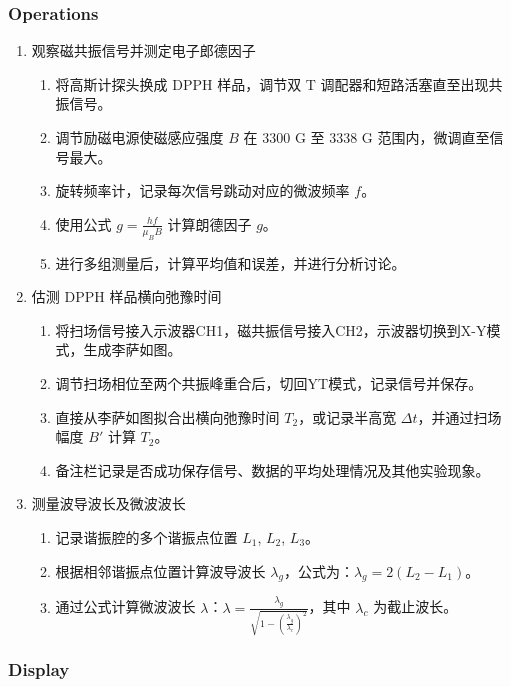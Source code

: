 \subsubsection{Operations}
\begin{enumerate}
	\item 观察磁共振信号并测定电子郎德因子
	\begin{enumerate}
		\item 将高斯计探头换成 DPPH 样品，调节双 T 调配器和短路活塞直至出现共振信号。
		\item 调节励磁电源使磁感应强度 $B$ 在 3300 G 至 3338 G 范围内，微调直至信号最大。
		\item 旋转频率计，记录每次信号跳动对应的微波频率 $f$。
		\item 使用公式 $g = \frac{h f}{\mu_B B}$ 计算朗德因子 $g$。
		\item 进行多组测量后，计算平均值和误差，并进行分析讨论。
	\end{enumerate}
	
	\item 估测 DPPH 样品横向弛豫时间
	\begin{enumerate}
		\item 将扫场信号接入示波器CH1，磁共振信号接入CH2，示波器切换到X-Y模式，生成李萨如图。
		\item 调节扫场相位至两个共振峰重合后，切回YT模式，记录信号并保存。
		\item 直接从李萨如图拟合出横向弛豫时间 $T_2$，或记录半高宽 $\Delta t$，并通过扫场幅度 $B'$ 计算 $T_2$。
		\item 备注栏记录是否成功保存信号、数据的平均处理情况及其他实验现象。
	\end{enumerate}
	
	\item 测量波导波长及微波波长
	\begin{enumerate}
		\item 记录谐振腔的多个谐振点位置 $L_1$, $L_2$, $L_3$。
		\item 根据相邻谐振点位置计算波导波长 $\lambda_g$，公式为：$\lambda_g = 2 (L_2 - L_1)$。
		\item 通过公式计算微波波长 $\lambda$：$\lambda = \frac{\lambda_g}{\sqrt{1 - \left( \frac{\lambda_g}{\lambda_c} \right)^2}}$，其中 $\lambda_c$ 为截止波长。
	\end{enumerate}
\end{enumerate}	

\subsubsection{Display}

